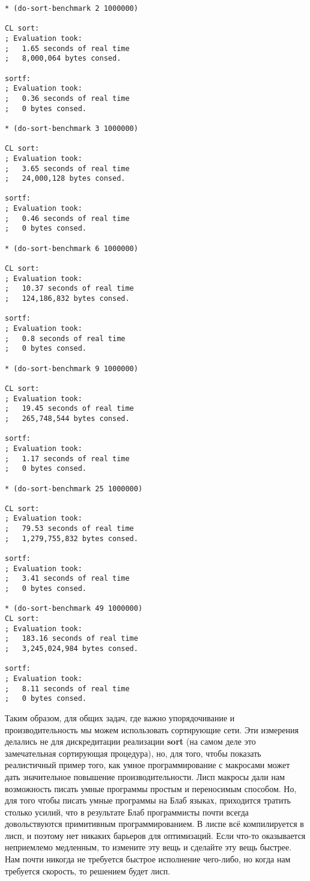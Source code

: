 \begin{verbatim}
* (do-sort-benchmark 2 1000000)

CL sort:
; Evaluation took:
;   1.65 seconds of real time
;   8,000,064 bytes consed.

sortf:
; Evaluation took:
;   0.36 seconds of real time
;   0 bytes consed. 

* (do-sort-benchmark 3 1000000)

CL sort:
; Evaluation took:
;   3.65 seconds of real time
;   24,000,128 bytes consed.

sortf:
; Evaluation took:
;   0.46 seconds of real time
;   0 bytes consed. 

* (do-sort-benchmark 6 1000000)

CL sort:
; Evaluation took:
;   10.37 seconds of real time
;   124,186,832 bytes consed.

sortf:
; Evaluation took:
;   0.8 seconds of real time
;   0 bytes consed. 

* (do-sort-benchmark 9 1000000)

CL sort:
; Evaluation took:
;   19.45 seconds of real time
;   265,748,544 bytes consed.

sortf:
; Evaluation took:
;   1.17 seconds of real time
;   0 bytes consed. 

* (do-sort-benchmark 25 1000000)

CL sort:
; Evaluation took:
;   79.53 seconds of real time
;   1,279,755,832 bytes consed.

sortf:
; Evaluation took:
;   3.41 seconds of real time
;   0 bytes consed. 

* (do-sort-benchmark 49 1000000)
CL sort:
; Evaluation took:
;   183.16 seconds of real time
;   3,245,024,984 bytes consed.

sortf:
; Evaluation took:
;   8.11 seconds of real time
;   0 bytes consed. 
\end{verbatim}



Таким образом, для общих задач, где важно упорядочивание и производительность мы можем использовать сортирующие сети. Эти измерения делались не для дискредитации реализации \textbf{sort} (на самом деле это замечательная сортирующая процедура), но, для того, чтобы показать реалистичный пример того, как умное программирование с макросами может дать значительное повышение производительности. Лисп макросы дали нам возможность писать умные программы простым и переносимым способом. Но, для того чтобы писать умные программы на Блаб языках, приходится тратить столько усилий, что в результате Блаб программисты почти всегда довольствуются примитивным программированием. В лиспе всё компилируется в лисп, и поэтому нет никаких барьеров для оптимизаций. Если что-то оказывается неприемлемо медленным, то измените эту вещь и сделайте эту вещь быстрее. Нам почти никогда не требуется быстрое исполнение чего-либо, но когда нам требуется скорость, то решением будет лисп.


